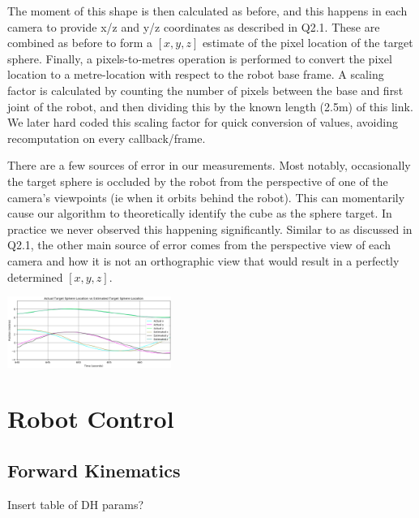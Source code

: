 \documentclass[11pt]{article}
\begin{document}
The moment of this shape is then calculated as before, and this happens in each camera to provide x/z and y/z coordinates as described in Q2.1. These are combined as before to form a $[x,y,z]$ estimate of the pixel location of the target sphere. Finally, a pixels-to-metres operation is performed to convert the pixel location to a metre-location with respect to the robot base frame. A scaling factor is calculated by counting the number of pixels between the base and first joint of the robot, and then dividing this by the known length (2.5m) of this link. We later hard coded this scaling factor for quick conversion of values, avoiding recomputation on every callback/frame.

There are a few sources of error in our measurements. Most notably, occasionally the target sphere is occluded by the robot from the perspective of one of the camera's viewpoints (ie when it orbits behind the robot). This can momentarily cause our algorithm to theoretically identify the cube as the sphere target. In practice we never observed this happening significantly. Similar to as discussed in Q2.1, the other main source of error comes from the perspective view of each camera and how it is not an orthographic view that would result in a perfectly determined $[x,y,z]$.

\begin{center}
    \includegraphics[width=0.4\textwidth]{images/2.2_target.png}
\end{center}

\section{Robot Control}
\subsection{Forward Kinematics}

Insert table of DH params?
\end{document}
